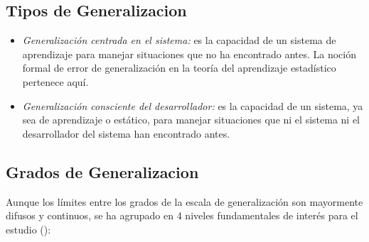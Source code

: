 \subsection{Tipos de Generalizacion}

\begin{itemize}
\item \textit{Generalización centrada en el sistema:} es la capacidad de un sistema de aprendizaje para manejar situaciones que no ha encontrado antes. La noción formal de error de generalización en la teoría del aprendizaje estadístico pertenece aquí.

\item \textit{Generalización consciente del desarrollador:} es la capacidad de un sistema, ya sea de aprendizaje o estático, para manejar situaciones que ni el sistema ni el desarrollador del sistema han encontrado antes.
\end{itemize}

\subsection{Grados de Generalizacion}

Aunque los límites entre los grados de la escala de generalización son mayormente difusos y continuos, se ha agrupado en 4 niveles fundamentales de interés para el estudio (\cite{chollet2019measure}):

